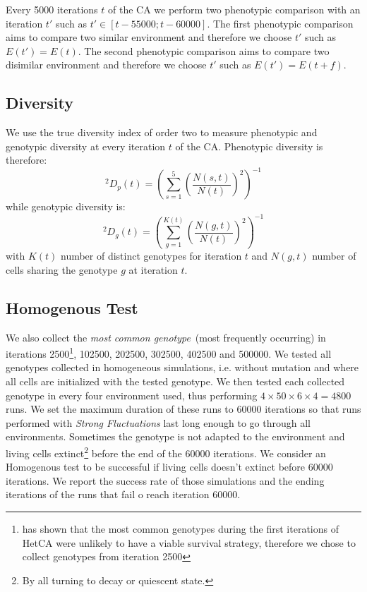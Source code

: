 Every 5000 iterations $t$ of the CA we perform two phenotypic comparison with an iteration $t'$ such as $t'\in[t-55000;t-60000]$. The first phenotypic comparison aims to compare two similar environment and therefore we choose $t'$ such as $E(t')=E(t)$. The second phenotypic comparison aims to compare two disimilar environment and therefore we choose $t'$ such as $E(t')=E(t+f)$.  

\subsection{Diversity}
We use the true diversity index of order two to measure phenotypic and genotypic diversity at every iteration $t$ of the CA. Phenotypic diversity is therefore: $$^2D_p(t)=(\sum_{s=1}^5 (\frac{N(s,t)}{N(t)})^2)^{-1}$$ while genotypic diversity is: $$^2D_g(t)=(\sum_{g=1}^{K(t)} (\frac{N(g,t)}{N(t)})^2)^{-1}$$ with $K(t)$ number of distinct genotypes for iteration $t$ and $N(g,t)$ number of cells sharing the genotype $g$ at iteration $t$.

\subsection{Homogenous Test}
We also collect the \emph{most common genotype}~(most frequently occurring) in iterations 2500\footnote{\citep{medernach2015evolutionary}  has shown that the most common genotypes during the first iterations of HetCA were unlikely to have a viable survival strategy, therefore we chose to collect genotypes from iteration 2500}, 102500, 202500, 302500, 402500 and 500000. We tested all genotypes collected in homogeneous simulations, i.e. without mutation and where all cells are initialized with the tested genotype. We then tested each collected genotype in every four environment used, thus performing $4\times50\times6\times4=4800$ runs. We set the maximum duration of these runs to 60000 iterations so that runs performed with \emph{Strong Fluctuations} last long enough to go through all environments. Sometimes the genotype is not adapted to the environment and living cells extinct\footnote{By all turning to decay or quiescent state.} before the end of the 60000 iterations. We consider an Homogenous test to be successful if living cells doesn't extinct before 60000 iterations. We report the success rate of those simulations and the ending iterations of the runs that fail o reach iteration 60000. 

